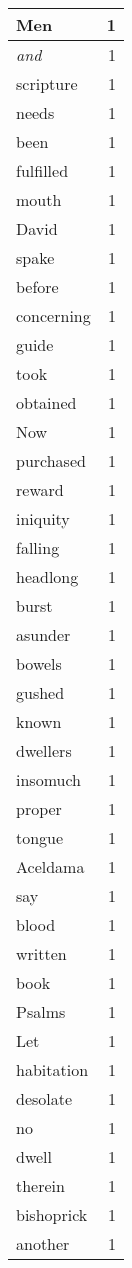 \begin{center}
\begin{longtable}{l|r}
Men & 1 \\ \hline
\emph{and} & 1 \\ \hline
scripture & 1 \\ \hline
needs & 1 \\ \hline
been & 1 \\ \hline
fulfilled & 1 \\ \hline
mouth & 1 \\ \hline
David & 1 \\ \hline
spake & 1 \\ \hline
before & 1 \\ \hline
concerning & 1 \\ \hline
guide & 1 \\ \hline
took & 1 \\ \hline
obtained & 1 \\ \hline
Now & 1 \\ \hline
purchased & 1 \\ \hline
reward & 1 \\ \hline
iniquity & 1 \\ \hline
falling & 1 \\ \hline
headlong & 1 \\ \hline
burst & 1 \\ \hline
asunder & 1 \\ \hline
bowels & 1 \\ \hline
gushed & 1 \\ \hline
known & 1 \\ \hline
dwellers & 1 \\ \hline
insomuch & 1 \\ \hline
proper & 1 \\ \hline
tongue & 1 \\ \hline
Aceldama & 1 \\ \hline
say & 1 \\ \hline
blood & 1 \\ \hline
written & 1 \\ \hline
book & 1 \\ \hline
Psalms & 1 \\ \hline
Let & 1 \\ \hline
habitation & 1 \\ \hline
desolate & 1 \\ \hline
no & 1 \\ \hline
dwell & 1 \\ \hline
therein & 1 \\ \hline
bishoprick & 1 \\ \hline
another & 1 \\ \hline

\end{longtable}
\end{center}
